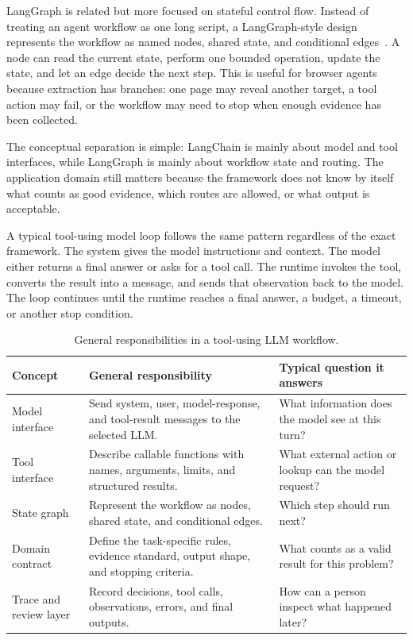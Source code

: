 LangGraph is related but more focused on stateful control flow. Instead of treating an
agent workflow as one long script, a LangGraph-style design represents the workflow as
named nodes, shared state, and conditional edges~\cite{langgraph-docs}. A node can read
the current state, perform one bounded operation, update the state, and let an edge
decide the next step. This is useful for browser agents because extraction has
branches: one page may reveal another target, a tool action may fail, or the workflow
may need to stop when enough evidence has been collected.



The conceptual separation is simple: LangChain is mainly about model and tool
interfaces, while LangGraph is mainly about workflow state and routing. The application
domain still matters because the framework does not know by itself what counts as good
evidence, which routes are allowed, or what output is acceptable.



A typical tool-using model loop follows the same pattern regardless of the exact
framework. The system gives the model instructions and context. The model either
returns a final answer or asks for a tool call. The runtime invokes the tool, converts
the result into a message, and sends that observation back to the model. The loop
continues until the runtime reaches a final answer, a budget, a timeout, or another stop
condition.



\begin{table}[!htbp]
\centering
\begin{tabularx}{\textwidth}{Q{3.2cm} Y Y}
\toprule
{}
Concept & General responsibility & Typical question it answers \\ \midrule
Model interface & Send system, user, model-response, and tool-result messages to the
selected LLM. & What information does the model see at this turn? \\
Tool interface & Describe callable functions with names, arguments, limits, and
structured results. & What external action or lookup can the model request? \\
State graph & Represent the workflow as nodes, shared state, and conditional edges.
& Which step should run next? \\
Domain contract & Define the task-specific rules, evidence standard, output shape,
and stopping criteria. & What counts as a valid result for this problem? \\
Trace and review layer & Record decisions, tool calls, observations, errors, and
final outputs. & How can a person inspect what happened later? \\
\bottomrule
\end{tabularx}
\caption{General responsibilities in a tool-using LLM workflow.}\label{tab:langchain-langgraph-runtime-map}
\end{table}

